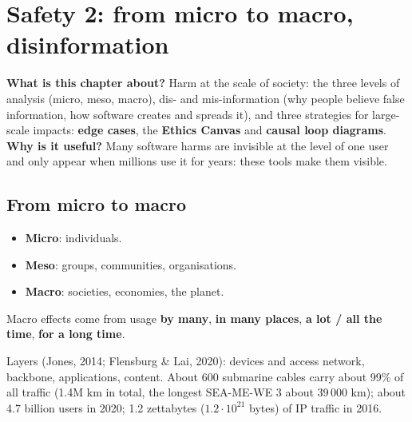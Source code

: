 \documentclass[11pt,a4paper,openany]{book}
\begin{document}
\chapter{Safety 2: from micro to macro, disinformation}

\begin{rembox}[title={In a nutshell}]
\textbf{What is this chapter about?} Harm at the scale of society: the three levels of analysis
(micro, meso, macro), dis- and mis-information (why people believe false information, how
software creates and spreads it), and three strategies for large-scale impacts: \textbf{edge
cases}, the \textbf{Ethics Canvas} and \textbf{causal loop diagrams}. \\
\textbf{Why is it useful?} Many software harms are invisible at the level of one user and only
appear when millions use it for years: these tools make them visible.
\end{rembox}


\section{From micro to macro}

\begin{defnbox}[title={Three levels of analysis}]
\begin{itemize}
  \item \textbf{Micro}: individuals.
  \item \textbf{Meso}: groups, communities, organisations.
  \item \textbf{Macro}: societies, economies, the planet.
\end{itemize}
Macro effects come from usage \textbf{by many}, \textbf{in many places}, \textbf{a lot / all the
time}, \textbf{for a long time}.
\end{defnbox}

\begin{exbox}[title={The internet as a macro-scale system}]
Layers (Jones, 2014; Flensburg \& Lai, 2020): devices and access network, backbone, applications,
content. About 600 submarine cables carry about 99\% of all traffic (1.4M km in total, the
longest SEA-ME-WE 3 about 39\,000 km); about 4.7 billion users in 2020; 1.2 zettabytes
($1.2\cdot 10^{21}$ bytes) of IP traffic in 2016.
\end{exbox}
\end{document}
